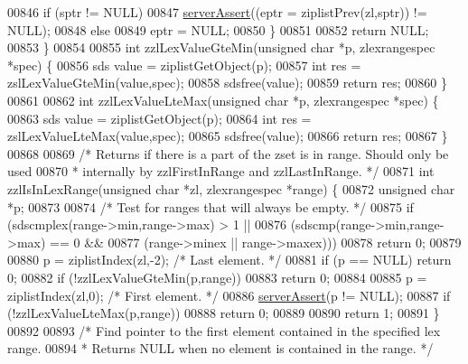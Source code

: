 \begin{DoxyCode}
00846         \textcolor{keywordflow}{if} (sptr != NULL)
00847             \hyperlink{server_8h_a88114b5169b4c382df6b56506285e56a}{serverAssert}((eptr = ziplistPrev(zl,sptr)) != NULL);
00848         \textcolor{keywordflow}{else}
00849             eptr = NULL;
00850     \}
00851 
00852     \textcolor{keywordflow}{return} NULL;
00853 \}
00854 
00855 \textcolor{keywordtype}{int} zzlLexValueGteMin(\textcolor{keywordtype}{unsigned} \textcolor{keywordtype}{char} *p, zlexrangespec *spec) \{
00856     sds value = ziplistGetObject(p);
00857     \textcolor{keywordtype}{int} res = zslLexValueGteMin(value,spec);
00858     sdsfree(value);
00859     \textcolor{keywordflow}{return} res;
00860 \}
00861 
00862 \textcolor{keywordtype}{int} zzlLexValueLteMax(\textcolor{keywordtype}{unsigned} \textcolor{keywordtype}{char} *p, zlexrangespec *spec) \{
00863     sds value = ziplistGetObject(p);
00864     \textcolor{keywordtype}{int} res = zslLexValueLteMax(value,spec);
00865     sdsfree(value);
00866     \textcolor{keywordflow}{return} res;
00867 \}
00868 
00869 \textcolor{comment}{/* Returns if there is a part of the zset is in range. Should only be used}
00870 \textcolor{comment}{ * internally by zzlFirstInRange and zzlLastInRange. */}
00871 \textcolor{keywordtype}{int} zzlIsInLexRange(\textcolor{keywordtype}{unsigned} \textcolor{keywordtype}{char} *zl, zlexrangespec *range) \{
00872     \textcolor{keywordtype}{unsigned} \textcolor{keywordtype}{char} *p;
00873 
00874     \textcolor{comment}{/* Test for ranges that will always be empty. */}
00875     \textcolor{keywordflow}{if} (sdscmplex(range->min,range->max) > 1 ||
00876             (sdscmp(range->min,range->max) == 0 &&
00877             (range->minex || range->maxex)))
00878         \textcolor{keywordflow}{return} 0;
00879 
00880     p = ziplistIndex(zl,-2); \textcolor{comment}{/* Last element. */}
00881     \textcolor{keywordflow}{if} (p == NULL) \textcolor{keywordflow}{return} 0;
00882     \textcolor{keywordflow}{if} (!zzlLexValueGteMin(p,range))
00883         \textcolor{keywordflow}{return} 0;
00884 
00885     p = ziplistIndex(zl,0); \textcolor{comment}{/* First element. */}
00886     \hyperlink{server_8h_a88114b5169b4c382df6b56506285e56a}{serverAssert}(p != NULL);
00887     \textcolor{keywordflow}{if} (!zzlLexValueLteMax(p,range))
00888         \textcolor{keywordflow}{return} 0;
00889 
00890     \textcolor{keywordflow}{return} 1;
00891 \}
00892 
00893 \textcolor{comment}{/* Find pointer to the first element contained in the specified lex range.}
00894 \textcolor{comment}{ * Returns NULL when no element is contained in the range. */}

\end{DoxyCode}
